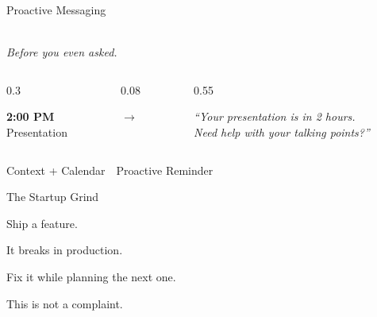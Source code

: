 \begin{frame}{Proactive Messaging}
\begin{center}
  {\large{}}\\[0.3em]
  {\normalsize\itshape Before you even asked.}
\end{center}
\vspace{0.8em}
\begin{columns}[c]
  \begin{column}{0.3\textwidth}
    \begin{methodbox}[Calendar]
      \centering\footnotesize
      \textbf{2:00 PM}\\
      Presentation
    \end{methodbox}
  \end{column}
  \begin{column}{0.08\textwidth}
    \begin{center}
      {\large\color{primarygold}$\rightarrow$}
    \end{center}
  \end{column}
  \begin{column}{0.55\textwidth}
    \begin{keybox}[AI Message]
      \footnotesize\itshape
      ``Your presentation is in 2 hours.\\
      Need help with your talking points?''
    \end{keybox}
  \end{column}
\end{columns}
\vspace{0.8em}
\begin{center}
  {\small Context + Calendar\ \higold{$\rightarrow$}\ Proactive Reminder}\\[0.4em]
  {\footnotesize{}}
\end{center}
\end{frame}

\begin{frame}{The Startup Grind}
\vspace{0.5em}
\begin{description}[labelwidth=2.2cm, leftmargin=2.5cm]
  \item[\hi{Monday}]    Ship a feature.
  \item[\higold{Tuesday}]   It breaks in production.
  \item[\hi{Wednesday}] Fix it while planning the next one.
\end{description}
\vspace{1.2em}
\begin{highlightbox}[]
  \centering
  {\normalsize This is not a complaint.\ \ }
\end{highlightbox}
\vspace{0.8em}
\begin{center}
  {\small{}}
\end{center}
\end{frame}

